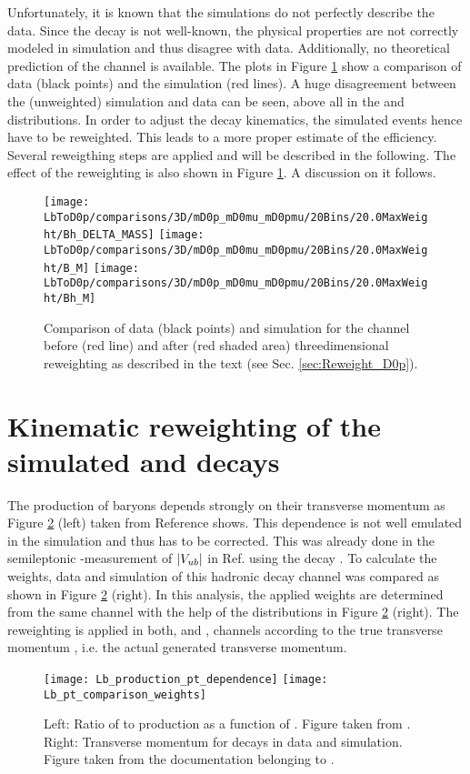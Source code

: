 Unfortunately, it is known that the simulations do not perfectly describe the data. 
Since the decay \LbToDpmunuX is not well-known, the physical properties are not correctly modeled in simulation and thus disagree with data.
Additionally, no theoretical prediction of the \LbToDpmunuX channel is available.
The plots in Figure \ref{fig:reweighting} show a comparison of data (black points) and the simulation (red lines).
A huge disagreement between the (unweighted) simulation and data can be seen, above all in the \MDp and \MDmu distributions.
In order to adjust the decay kinematics, the simulated events hence have to be reweighted.
This leads to a more proper estimate of the efficiency.
Several reweigthing steps are applied and will be described in the following.
The effect of the reweighting is also shown in Figure \ref{fig:reweighting}.
A discussion on it follows.
\begin{figure}[tbp]
	\centering
	\texttt{[image: LbToD0p/comparisons/3D/mD0p\_mD0mu\_mD0pmu/20Bins/20.0MaxWeight/Bh\_DELTA\_MASS]}
	\texttt{[image: LbToD0p/comparisons/3D/mD0p\_mD0mu\_mD0pmu/20Bins/20.0MaxWeight/B\_M]}
	\texttt{[image: LbToD0p/comparisons/3D/mD0p\_mD0mu\_mD0pmu/20Bins/20.0MaxWeight/Bh\_M]}
	\caption{Comparison of data (black points) and simulation for the \LbToDpmunuX channel before (red line) and after (red shaded area) threedimensional reweighting as described in the text (see Sec. \ref{sec:Reweight_D0p}).}
	\label{fig:reweighting}
\end{figure}

\section{Kinematic reweighting of the simulated \LbToDpmunuX and \LbToLcmunu decays}
The production of \Lb baryons depends strongly on their transverse momentum as Figure \ref{fig:LbPTrew} (left) taken from Reference \cite{Lb_production_kinematic} shows. 
This dependence is not well emulated in the simulation and thus has to be corrected. 
This was already done in the semileptonic \lhcb-measurement of $|{V_{{u}{b}}}|$ in Ref. \cite{SL_Vub} using the decay \decay{\Lb}{\jpsi\Dz\proton}. 
To calculate the weights, data and simulation of this hadronic \Lb decay channel was compared as shown in Figure \ref{fig:LbPTrew} (right). 
In this analysis, the applied weights are determined from the same channel with the help of the distributions in Figure \ref{fig:LbPTrew} (right).
The reweighting is applied in both, \LbToDpmunuX and \LbToLcmunu, channels according to the true \Lb transverse momentum \pt, i.e. the actual generated transverse momentum.
\begin{figure}[tbp]
	\centering
	\texttt{[image: Lb\_production\_pt\_dependence]}
	\texttt{[image: Lb\_pt\_comparison\_weights]}
	\caption{Left: Ratio of \Lb to \Bd production as a function of \pt. Figure taken from \cite{Lb_production_kinematic}.  Right: Transverse \Lb momentum for \decay{\Lb}{\jpsi\Dz\proton} decays in data and simulation. Figure taken from the documentation belonging to \cite{SL_Vub}.}
	\label{fig:LbPTrew}
\end{figure}


